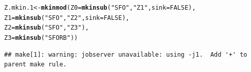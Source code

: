\documentclass[12pt,a4paper]{article}\usepackage[]{graphicx}\usepackage[]{color}
\makeatletter
\newcommand{\hlnum}[1]{\textcolor[rgb]{0.686,0.059,0.569}{#1}}%
\newcommand{\hlstr}[1]{\textcolor[rgb]{0.192,0.494,0.8}{#1}}%
\newcommand{\hlstd}[1]{\textcolor[rgb]{0.345,0.345,0.345}{#1}}%
\newcommand{\hlkwb}[1]{\textcolor[rgb]{0.69,0.353,0.396}{#1}}%
\newcommand{\hlkwc}[1]{\textcolor[rgb]{0.333,0.667,0.333}{#1}}%
\newcommand{\hlkwd}[1]{\textcolor[rgb]{0.737,0.353,0.396}{\textbf{#1}}}%
\newenvironment{kframe}{%
 \def\at@end@of@kframe{}%
 \ifinner\ifhmode%
  \def\at@end@of@kframe{\end{minipage}}%
  \begin{minipage}{\columnwidth}%
 \fi\fi%
 \def\FrameCommand##1{\hskip\@totalleftmargin \hskip-\fboxsep
 \colorbox{shadecolor}{##1}\hskip-\fboxsep
     \hskip-\linewidth \hskip-\@totalleftmargin \hskip\columnwidth}%
 \MakeFramed {\advance\hsize-\width
   \@totalleftmargin\z@ \linewidth\hsize
   \@setminipage}}%
 {\par\unskip\endMakeFramed%
 \at@end@of@kframe}
\newenvironment{knitrout}{}{} %
\makeatother
\begin{document}
\begin{knitrout}
\color{fgcolor}\begin{kframe}
\begin{alltt}
\hlstd{Z.mkin.1} \hlkwb{<-} \hlkwd{mkinmod}\hlstd{(}\hlkwc{Z0} \hlstd{=} \hlkwd{mkinsub}\hlstd{(}\hlstr{"SFO"}\hlstd{,} \hlstr{"Z1"}\hlstd{,} \hlkwc{sink} \hlstd{=} \hlnum{FALSE}\hlstd{),}
                    \hlkwc{Z1} \hlstd{=} \hlkwd{mkinsub}\hlstd{(}\hlstr{"SFO"}\hlstd{,} \hlstr{"Z2"}\hlstd{,} \hlkwc{sink} \hlstd{=} \hlnum{FALSE}\hlstd{),}
                    \hlkwc{Z2} \hlstd{=} \hlkwd{mkinsub}\hlstd{(}\hlstr{"SFO"}\hlstd{,} \hlstr{"Z3"}\hlstd{),}
                    \hlkwc{Z3} \hlstd{=} \hlkwd{mkinsub}\hlstd{(}\hlstr{"SFORB"}\hlstd{))}
\end{alltt}
\begin{verbatim}
## make[1]: warning: jobserver unavailable: using -j1.  Add '+' to parent make rule.
\end{verbatim}



\end{kframe}
\end{knitrout}
\end{document}
